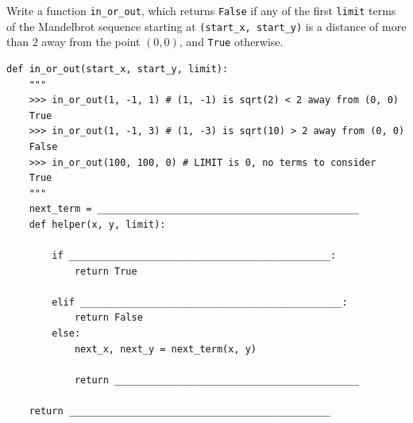 \begin{blocksection}
\question Write a function \lstinline{in_or_out}, which returns \lstinline{False} if any of the first \lstinline{limit} terms of the Mandelbrot sequence starting at \lstinline{(start_x, start_y)} is a distance of more than $2$ away from the point $(0, 0)$, and \lstinline{True} otherwise. 
\begin{lstlisting}
def in_or_out(start_x, start_y, limit):
    """
    >>> in_or_out(1, -1, 1) # (1, -1) is sqrt(2) < 2 away from (0, 0)
    True
    >>> in_or_out(1, -1, 3) # (1, -3) is sqrt(10) > 2 away from (0, 0)
    False
    >>> in_or_out(100, 100, 0) # LIMIT is 0, no terms to consider
    True
    """
    next_term = ______________________________________________
    def helper(x, y, limit):

        if ______________________________________________:
            return True

        elif ______________________________________________: 
            return False
        else: 
            next_x, next_y = next_term(x, y)

            return ___________________________________________
            
    return ______________________________________________
\end{lstlisting}
\end{blocksection}
